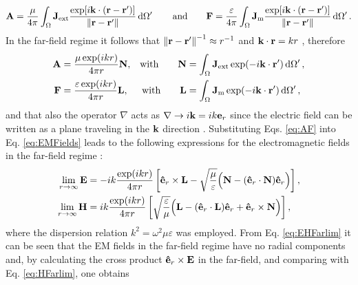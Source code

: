 %
\begin{align}
    \vb{A} = \frac{\mu}{4\pi} \int_\Omega \vb{J}_\text{ext}  \frac{\exp[i\vb{k}\cdot(\vb{r}-\vb{r}')]}{\norm{\vb{r}-\vb{r}'}}\dd{\Omega'}
    \qquad
    \text{and}
    \qquad
    \vb{F} = \frac{\varepsilon}{4\pi} \int_\Omega \vb{J}_\text{m}  \frac{\exp[i\vb{k}\cdot(\vb{r}-\vb{r}')]}{\norm{\vb{r}-\vb{r}'}}\dd{\Omega'}.
\end{align}
%
In the far-field regime it follows that $\norm{\vb{r}-\vb{r}'}^{-1}\approx r^{-1}$ and $\vb{k}\cdot \vb{r} = kr$ \cite{jackson_classical_1999,zangwill_modern_2013}, therefore
%
\begin{subequations}
    \label{eq:AF}
\begin{align}
    \vb{A} &= \frac{\mu\exp(ikr)}{4\pi r}\vb{N},         &\text{with} \qquad \vb{N} &= \int_\Omega \vb{J}_\text{ext}  \exp(-i\vb{k}\cdot\vb{r}')\dd{\Omega'},\\
    \vb{F} &= \frac{\varepsilon\exp(ikr)}{4\pi r}\vb{L}, &\text{with} \qquad \vb{L} &= \int_\Omega \vb{J}_\text{m}  \exp(-i\vb{k}\cdot\vb{r}')\dd{\Omega'},
\end{align}
\end{subequations}
%
and that also the operator $\nabla$ acts as $\nabla\to i\vb{k} = ik\vb{e}_r$ since the electric field can be written as a plane traveling in the $\vb{k}$ direction \cite{jin_theory_2010,jackson_classical_1999}. Substituting Eqs. \eqref{eq:AF} into Eq. \eqref{eq:EMFields} leads to the following expressions for the electromagnetic fields in the far-field regime \cite{jin_theory_2010}:
%
\begin{subequations}
    \label{eq:EHFarlim}
\begin{align}
    \lim_{r\to\infty}\vb{E} &= -i k\frac{\exp(ikr)}{4\pi r}
                \left[ \vu{e}_r\times\vb{L}-\sqrt{\frac{\mu}{\varepsilon}}  \Big(\vb{N}-(\vu{e}_r\cdot\vb{N})\vu{e}_r\Big) \right],
            \label{eq:EFarlim}\\
    \lim_{r\to\infty}\vb{H} &=i k\frac{\exp(ikr)}{4\pi r}
                \left[\sqrt{\frac{\varepsilon}{\mu}}  \Big(\vb{L}-(\vu{e}_r\cdot\vb{L})\vu{e}_r + \vu{e}_r\times\vb{N}\Big) \right],
             \label{eq:HFarlim}
\end{align}
\end{subequations}
%
where the dispersion relation $k^2 = \omega^2\mu\varepsilon$ was employed. From Eq. \eqref{eq:EHFarlim} it can be seen that the EM fields in the far-field regime have no radial components and, by calculating the cross product $\vu{e}_r\times\vb{E}$ in the far-field, and comparing with Eq. \eqref{eq:HFarlim}, one obtains

